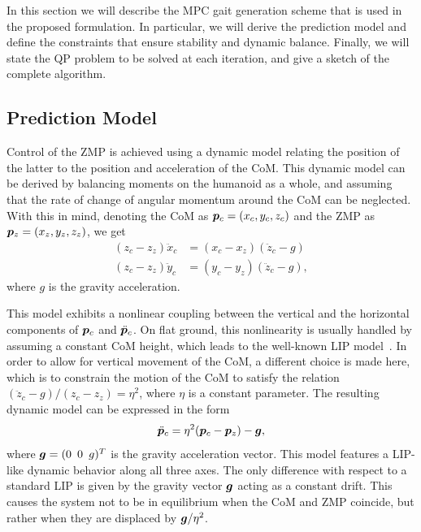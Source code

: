In this section we will describe the MPC gait generation scheme that is used in the proposed formulation. In particular, we will derive the prediction model and define the constraints that ensure stability and dynamic balance. Finally, we will state the QP problem to be solved at each iteration, and give a sketch of the complete algorithm.

\smallskip

\subsection{Prediction Model}

Control of the ZMP is achieved using a dynamic model relating the position of the latter to the position and acceleration of the CoM. This dynamic model can be derived by balancing moments on the humanoid as a whole, and assuming that the rate of change of angular momentum around the CoM can be neglected. With this in mind, denoting the CoM as ${\bm{p}}_c = (x_c, y_c, z_c)$ and the ZMP as ${\bm{p}}_z = (x_z, y_z, z_z)$, we get
\begin{equation}\begin{split}
(z_c - z_z)\ddot x_c &= (x_c - x_z)(\ddot z_c - g) \\
(z_c - z_z)\ddot y_c &= (y_c - y_z)(\ddot z_c - g),
\end{split}\end{equation}
where $g$ is the gravity acceleration.

This model exhibits a nonlinear coupling between the vertical and the horizontal components of ${\bm{p}}_c$ and $\ddot{{\bm{p}}}_c$. On flat ground, this nonlinearity is usually handled by assuming a constant CoM height, which leads to the well-known LIP model~\cite{KaKaKaFuHaYoHi:03}. In order to allow for vertical movement of the CoM, a different choice is made here, which is to constrain the motion of the CoM to satisfy the relation $(\ddot z_c - g)/(z_c - z_z) = \eta^2$, where $\eta$ is a constant parameter.
The resulting dynamic model can be expressed in the form
\begin{equation}\label{eq:WoS:3dmodel}
\ddot {{\bm{p}}}_c = \eta^2({\bm{p}}_c - {\bm{p}}_z) - {\bm{g}},
\end{equation}
where ${\bm{g}} = (0\,\,\,0\,\,\,g)^T$ is the gravity acceleration vector. This model features a LIP-like dynamic behavior along all three axes. The only difference with respect to a standard LIP is given by the gravity vector ${\bm{g}}$ acting as a constant drift. This causes the system not to be in equilibrium when the CoM and ZMP coincide, but rather when they are displaced by ${\bm{g}}/\eta^2$.

